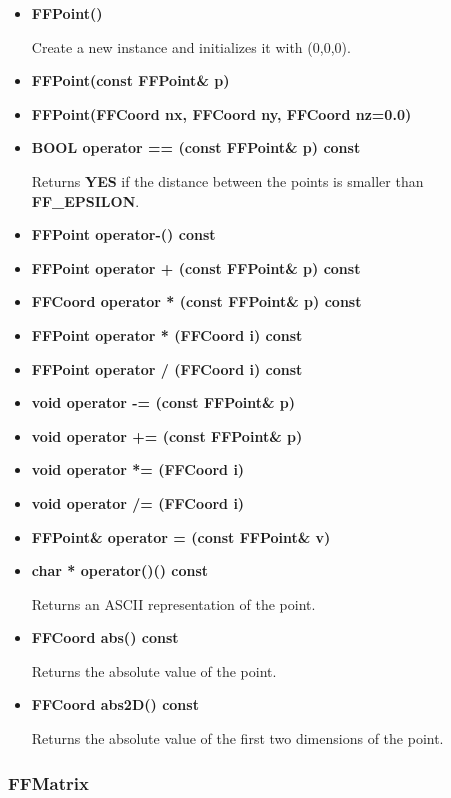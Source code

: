 \begin{itemize}

\item{\bf FFPoint()}

Create a new instance and initializes it with (0,0,0).

\item{\bf FFPoint(const FFPoint\& p)}
\item{\bf FFPoint(FFCoord nx, FFCoord ny, FFCoord nz=0.0)}

\item{\bf BOOL operator == (const FFPoint\& p) const}

Returns {\bf YES} if the distance between the points is smaller than
{\bf FF\_EPSILON}.

\item{\bf FFPoint operator-() const}

\item{\bf FFPoint operator + (const FFPoint\& p) const}
\item{\bf FFCoord operator * (const FFPoint\& p) const}
\item{\bf FFPoint operator * (FFCoord i) const}
\item{\bf FFPoint operator / (FFCoord i) const}

\item{\bf void operator -= (const FFPoint\& p)}
\item{\bf void operator += (const FFPoint\& p)}
\item{\bf void operator *= (FFCoord i)}
\item{\bf void operator /= (FFCoord i)}

\item{\bf FFPoint\& operator = (const FFPoint\& v)}
\item{\bf char * operator()() const}

Returns an ASCII representation of the point.

\item{\bf FFCoord abs() const}

Returns the absolute value of the point.

\item{\bf FFCoord abs2D() const}

Returns the absolute value of the first two dimensions of the point.

\end{itemize}

\subsubsection{FFMatrix}

